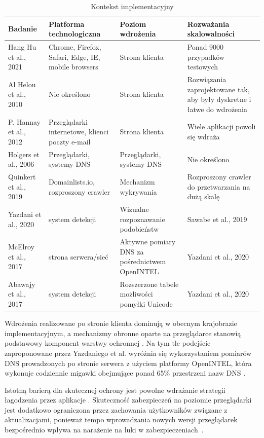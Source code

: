 \begin{table}[!ht]
\centering
\caption{Kontekst implementacyjny}
\label{tab:implementacyjnyTab}
{\footnotesize
\begin{tabularx}{\textwidth}{LLp{3cm}p{4cm}}
\toprule
\textbf{Badanie} & \textbf{Platforma technologiczna} & \textbf{
Poziom wdrożenia} & \textbf{Rozważania skalowalności} \\ \midrule
Hang Hu et al., 2021  &  Chrome, Firefox, Safari, Edge, IE, mobile browsers  & Strona klienta &Ponad 9000 przypadków testowych \\ 
Al Helou et al., 2010  & Nie określono & Strona klienta & Rozwiązania zaprojektowane tak, aby były dyskretne i łatwe do wdrożenia \\ 
P. Hannay et al., 2012  & Przeglądarki internetowe, klienci poczty e-mail & Strona klienta &Wiele aplikacji powoli się wdraża \\ 
Holgers et al., 2006  & Przeglądarki, systemy DNS & Przeglądarki, systemy DNS & Nie określono \\ 
Quinkert et al., 2019 & Domainlists.io, rozproszony crawler & Mechanizm wykrywania & Rozproszony crawler do przetwarzania na dużą skalę \\ 
Yazdani et al., 2020  & system detekcji & Wizualne rozpoznawanie podobieństw & Sawabe et al., 2019 \\ 
McElroy et al., 2017  & strona serwera/sieć & Aktywne pomiary DNS za pośrednictwem OpenINTEL & Yazdani et al., 2020 \\ 
Abawajy et al., 2017  & system detekcji & Rozszerzone tabele możliwości pomyłki Unicode & Yazdani et al., 2020 \\ \bottomrule
\end{tabularx}
}

\end{table}


Wdrożenia realizowane po stronie klienta dominują w obecnym krajobrazie implementacyjnym, a mechanizmy obronne oparte na przeglądarce stanowią podstawowy komponent warstwy ochronnej \cite{Hu2021}. Na tym tle podejście zaproponowane przez Yazdaniego et al. wyróżnia się wykorzystaniem pomiarów DNS prowadzonych po stronie serwera z użyciem platformy OpenINTEL, która wykonuje codziennie migawki obejmujące ponad 65\% przestrzeni nazw DNS \cite{Yazdani2020}.

Istotną barierą dla skutecznej ochrony jest powolne wdrażanie strategii łagodzenia przez aplikacje \cite{Hannay2011}. Skuteczność zabezpieczeń na poziomie przeglądarki jest dodatkowo ograniczona przez zachowania użytkowników związane z aktualizacjami, ponieważ tempo wprowadzania nowych wersji przeglądarek bezpośrednio wpływa na narażenie na luki w zabezpieczeniach~\cite{McElroy2017}.

